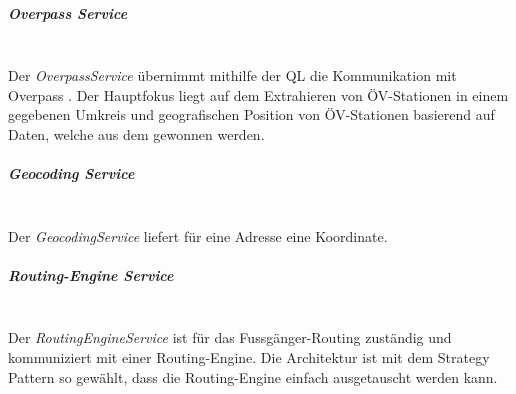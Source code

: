 \subparagraph{Overpass Service}\label{architektur:Overpass Service}~\\
Der \emph{OverpassService} übernimmt mithilfe der \ac{QL} die Kommunikation mit Overpass \cite{wiki:overpass}. Der Hauptfokus liegt auf dem Extrahieren von ÖV-Stationen in einem gegebenen Umkreis und geografischen Position von ÖV-Stationen basierend auf Daten, welche aus dem  gewonnen werden. 

\subparagraph{Geocoding Service}\label{architektur:Geocoding Service}~\\
Der \emph{GeocodingService} liefert für eine Adresse eine Koordinate.

\subparagraph{Routing-Engine Service}\label{architektur:Routing-Engine Service}~\\
Der \emph{RoutingEngineService} ist für das Fussgänger-Routing zuständig und kommuniziert mit einer Routing-Engine. Die Architektur ist mit dem Strategy Pattern so gewählt, dass die Routing-Engine einfach ausgetauscht werden kann.



